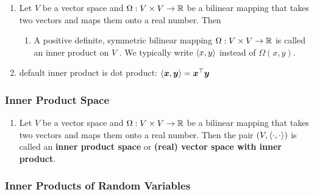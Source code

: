 \begin{enumerate}
    \item Let $V$ be a vector space and $\Omega  : V \times  V \to  \mathbb{R}$ be a bilinear mapping that takes two vectors and maps them onto a real number. Then
    \hfill \cite{mfml/book/mml/Deisenroth-Faisal-Ong}
    \begin{enumerate}
        \item A positive definite, symmetric bilinear mapping $\Omega  : V \times  V \to  \mathbb{R}$ is called an inner product on $V$ .
        We typically write $\langle x, y\rangle$ instead of $\Omega (x, y)$.
        \hfill \cite{mfml/book/mml/Deisenroth-Faisal-Ong}
    \end{enumerate}

    \item default inner product is dot product: $\langle\bm{x}, \bm{y}\rangle = \bm{x}^\top \bm{y}$
    \hfill \cite{mfml/book/mml/Deisenroth-Faisal-Ong}
\end{enumerate}







\subsubsection{Inner Product Space}

\begin{enumerate}
    \item Let $V$ be a vector space and $\Omega  : V \times  V \to  \mathbb{R}$ be a bilinear mapping that takes two vectors and maps them onto a real number.
    Then the pair $(V, \langle\cdot, \cdot\rangle)$ is called an \textbf{inner product space} or \textbf{(real) vector space with inner product}.
\end{enumerate}



\subsubsection{Inner Products of Random Variables}

